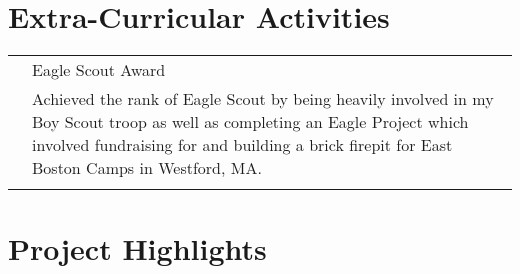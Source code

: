 \documentclass[12pt]{article}
\begin{document}
\section*{\selectfont Extra-Curricular Activities}
\begin{tabular}{p{2.3cm}|p{15.4cm}}
	& Eagle Scout Award\\&\small{Achieved the rank of Eagle Scout by being heavily involved in my Boy Scout troop as well as completing an Eagle Project which involved fundraising for and building a brick firepit for East Boston Camps in Westford, MA.}\\\multicolumn{2}{c}{} \\
\end{tabular}

\section*{\selectfont Project Highlights}
\end{document}
